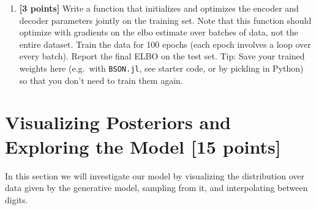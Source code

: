 \documentclass{article}
\begin{document}
\begin{enumerate}[label=(\alph*)]
	\item {\bf [3 points]} Write a function that initializes and optimizes the encoder and decoder parameters jointly on the training set. 
    Note that this function should optimize with gradients on the elbo estimate over batches of data, not the entire dataset.
    Train the data for 100 epochs (each epoch involves a loop over every batch).
    Report the final ELBO on the test set.
    Tip: Save your trained weights here (e.g.\ with \texttt{BSON.jl}, see starter code, or by pickling in Python) so that you don't need to train them again.
\end{enumerate}

\pagebreak

\section{Visualizing Posteriors and Exploring the Model [15 points]}
In this section we will investigate our model by visualizing the distribution over data given by the generative model, sampling from it, and interpolating between digits.
\end{document}
